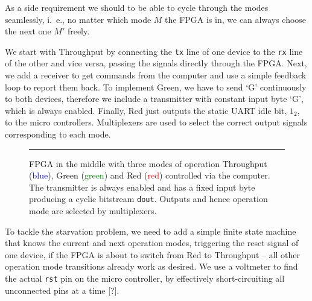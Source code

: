 As a side requirement we should to be able to cycle through the modes seamlessly, i.~e., no matter which mode $M$ the FPGA is in, we can always choose the next one $M'$ freely.

We start with \textsf{Throughput} by connecting the \texttt{tx} line of one device to the \texttt{rx} line of the other and vice versa, passing the signals directly through the FPGA. 
Next, we add a receiver to get commands from the computer and use a simple feedback loop to report them back. 
To implement \textsf{Green}, we have to send `G' continuously to both devices, therefore we include a transmitter with constant input byte `G', which is always enabled.
Finally, \textsf{Red} just outputs the static UART idle bit, $1_2$, to the micro controllers. 
Multiplexers are used to select the correct output signals corresponding to each mode. 

\begin{figure}[tb]
    \begin{center}
        
        \caption{FPGA in the middle with three modes of operation \textsf{Throughput} (\textcolor{blue}{blue}), \textsf{Green} (\textcolor{green}{green}) and \textsf{Red} (\textcolor{red}{red}) controlled via the computer. The transmitter is always enabled and has a fixed input byte producing a cyclic bitstream \texttt{dout}. Outputs and hence operation mode are selected by multiplexers.}
        \label{fig:as3-schematic}
        \vspace{1em}\hrule
    \end{center}
\end{figure}

To tackle the starvation problem, we need to add a simple finite state machine that knows the current and next operation modes, triggering the reset signal of one device, if the FPGA is about to switch from \textsf{Red} to \textsf{Throughput} -- all other operation mode transitions already work as desired. We use a voltmeter to find the actual \texttt{rst} pin on the micro controller, by effectively short-circuiting all unconnected pins at a time [?].
